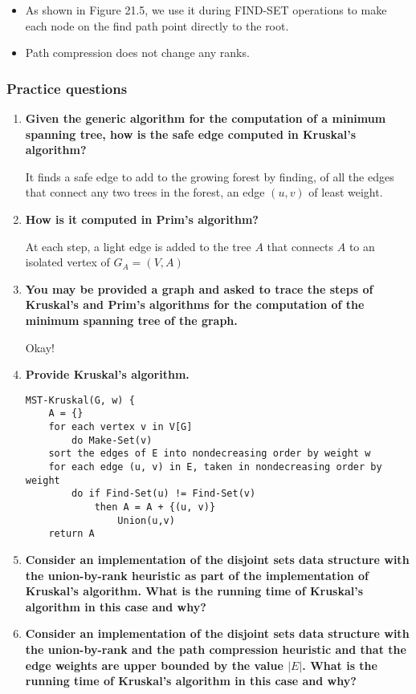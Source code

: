 \documentclass[a4paper,11pt]{article}
\begin{document}
\begin{itemize}
  \begin{itemize}
  \itemsep1pt\parskip0pt
  \item
    As shown in Figure 21.5, we use it during FIND-SET operations to
    make each node on the find path point directly to the root.
  \item
    Path compression does not change any ranks.
  \end{itemize}
\end{itemize}

\subsubsection{Practice questions}\label{practice-questions-18}

\begin{enumerate}
\def\labelenumi{\arabic{enumi}.}
\item
  \textbf{Given the generic algorithm for the computation of a minimum
  spanning tree, how is the safe edge computed in Kruskal's algorithm?}

  It finds a safe edge to add to the growing forest by finding, of all
  the edges that connect any two trees in the forest, an edge $(u,v)$ of
  least weight.
\item
  \textbf{How is it computed in Prim's algorithm?}

  At each step, a light edge is added to the tree $A$ that connects $A$
  to an isolated vertex of $G_A = (V, A)$
\item
  \textbf{You may be provided a graph and asked to trace the steps of
  Kruskal's and Prim's algorithms for the computation of the minimum
  spanning tree of the graph.}

  Okay!
\item
  \textbf{Provide Kruskal's algorithm.}

\begin{verbatim}
MST-Kruskal(G, w) {
    A = {}
    for each vertex v in V[G]
        do Make-Set(v)
    sort the edges of E into nondecreasing order by weight w
    for each edge (u, v) in E, taken in nondecreasing order by weight
        do if Find-Set(u) != Find-Set(v)
            then A = A + {(u, v)}
                Union(u,v)
    return A
\end{verbatim}
\item
  \textbf{Consider an implementation of the disjoint sets data structure
  with the union-by-rank heuristic as part of the implementation of
  Kruskal's algorithm. What is the running time of Kruskal's algorithm
  in this case and why?}
\item
  \textbf{Consider an implementation of the disjoint sets data structure
  with the union-by-rank and the path compression heuristic and that the
  edge weights are upper bounded by the value $|E|$. What is the running
  time of Kruskal's algorithm in this case and why?}


\end{enumerate}
\end{document}
